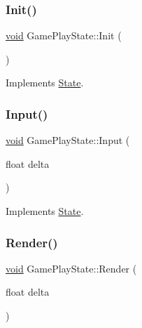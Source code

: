 \mbox{\label{classGamePlayState_ae13389eea1f83f27d18ba200f107937d}} 
\subsubsection{\texorpdfstring{Init()}{Init()}}
{\footnotesize\ttfamily \hyperlink{imgui__impl__opengl3__loader_8h_ac668e7cffd9e2e9cfee428b9b2f34fa7}{void} Game\+Play\+State\+::\+Init (\begin{DoxyParamCaption}{ }\end{DoxyParamCaption})\hspace{0.3cm}{\ttfamily [virtual]}}



Implements \hyperlink{classState_a7ab4d8c6aa239a17ed579d89a209b156}{State}.

\mbox{\label{classGamePlayState_a3bc9231fd11546b5dd13581ed2aa1afa}} 
\subsubsection{\texorpdfstring{Input()}{Input()}}
{\footnotesize\ttfamily \hyperlink{imgui__impl__opengl3__loader_8h_ac668e7cffd9e2e9cfee428b9b2f34fa7}{void} Game\+Play\+State\+::\+Input (\begin{DoxyParamCaption}\item[{float}]{delta }\end{DoxyParamCaption})\hspace{0.3cm}{\ttfamily [virtual]}}



Implements \hyperlink{classState_a1705412877f37a5cc8fc712542756076}{State}.

\mbox{\label{classGamePlayState_a4bd296aa04088a3d8249f569e86f21a7}} 
\subsubsection{\texorpdfstring{Render()}{Render()}}
{\footnotesize\ttfamily \hyperlink{imgui__impl__opengl3__loader_8h_ac668e7cffd9e2e9cfee428b9b2f34fa7}{void} Game\+Play\+State\+::\+Render (\begin{DoxyParamCaption}\item[{float}]{delta }\end{DoxyParamCaption})\hspace{0.3cm}{\ttfamily [virtual]}}



